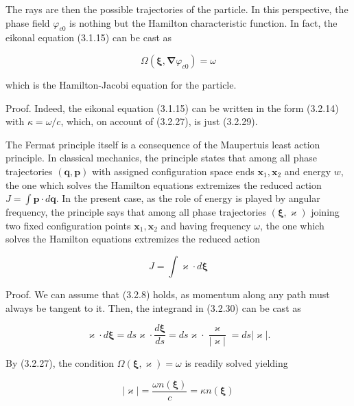 \documentclass{article}
\begin{document}
The rays are then the possible trajectories of the particle. In this perspective, the phase field $\varphi_{c 0}$ is nothing but the Hamilton characteristic function. In fact, the eikonal equation (3.1.15) can be cast as
 
\begin{equation*}
\Omega\left(\boldsymbol{\xi}, \boldsymbol{\nabla} \varphi_{c 0}\right)=\omega \tag{3.2.29}
\end{equation*}
 
which is the Hamilton-Jacobi equation for the particle.

Proof. Indeed, the eikonal equation (3.1.15) can be written in the form (3.2.14) with $\kappa=\omega / c$, which, on account of (3.2.27), is just (3.2.29).

The Fermat principle itself is a consequence of the Maupertuis least action
principle. In classical mechanics, the principle states that among all phase trajectories $(\boldsymbol{q}, \boldsymbol{p})$ with assigned configuration space ends $\boldsymbol{x}_{1}, \boldsymbol{x}_{2}$ and energy $w$, the one which solves the Hamilton equations extremizes the reduced action $J=\int \boldsymbol{p} \cdot d \boldsymbol{q}$. In the present case, as the role of energy is played by angular frequency, the principle says that among all phase trajectories $(\boldsymbol{\xi}, \boldsymbol{\varkappa})$ joining two fixed configuration points $\boldsymbol{x}_{1}, \boldsymbol{x}_{2}$ and having frequency $\omega$, the one which solves the Hamilton equations extremizes the reduced action
 
\begin{equation*}
J=\int \varkappa \cdot d \boldsymbol{\xi} \tag{3.2.30}
\end{equation*}
 

Proof. We can assume that (3.2.8) holds, as momentum along any path must always be tangent to it. Then, the integrand in (3.2.30) can be cast as
 
\begin{equation*}
\varkappa \cdot d \boldsymbol{\xi}=d s \boldsymbol{\varkappa} \cdot \frac{d \boldsymbol{\xi}}{d s}=d s \boldsymbol{\varkappa} \cdot \frac{\boldsymbol{\varkappa}}{|\boldsymbol{\varkappa}|}=d s|\boldsymbol{\varkappa}| . \tag{3.2.31}
\end{equation*}
 

By (3.2.27), the condition $\Omega(\boldsymbol{\xi}, \boldsymbol{\varkappa})=\omega$ is readily solved yielding
 
\begin{equation*}
|\varkappa|=\frac{\omega n(\boldsymbol{\xi})}{c}=\kappa n(\boldsymbol{\xi}) \tag{3.2.32}
\end{equation*}
 
\end{document}
